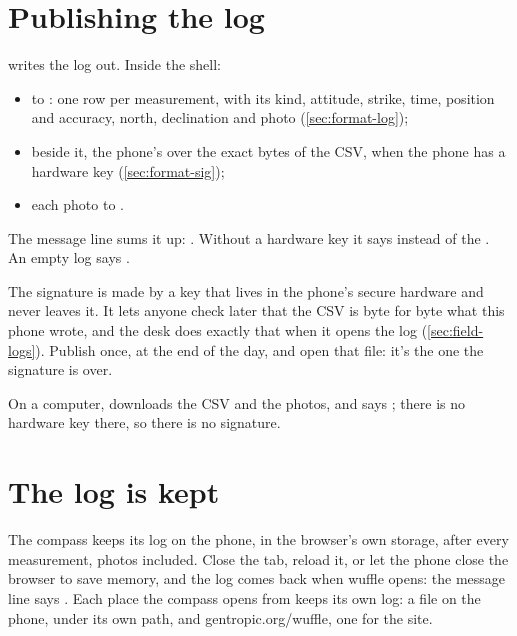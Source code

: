 \section{Publishing the log}\label{sec:publish}

 writes the log out. Inside the shell:

\begin{itemize}
\item {} to : one row per measurement, with its kind, attitude,
strike, time, position and accuracy, north, declination and photo (\cref{sec:format-log});
\item {} beside it, the phone's  over the exact bytes of the CSV,
when the phone has a hardware key (\cref{sec:format-sig});
\item each photo to .
\end{itemize}

The message line sums it up: . Without a hardware key it says  instead of the . An empty log says
.

The signature is made by a key that lives in the phone's secure hardware and never leaves it. It lets
anyone check later that the CSV is byte for byte what this phone wrote, and the desk does exactly that
when it opens the log (\cref{sec:field-logs}). Publish once, at the end of the day, and open that file:
it's the one the signature is over.

On a computer,  downloads the CSV and the photos, and says ; there is no hardware key there, so there is no signature.

\section{The log is kept}\label{sec:field-kept}

The compass keeps its log on the phone, in the browser's own storage, after every measurement, photos
included. Close the tab, reload it, or let the phone close the browser to save memory, and the log comes
back when wuffle opens: the message line says . Each place the compass opens from keeps its own log: a file on the phone, under
its own path, and gentropic.org/wuffle, one for the site.

